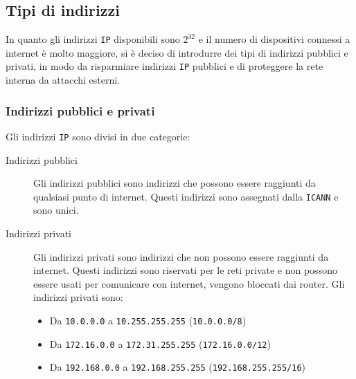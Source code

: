     \subsection{Tipi di indirizzi}
        In quanto gli indirizzi \texttt{IP} disponibili sono $2^{32}$ e il numero di dispositivi connessi a internet è molto maggiore, si è deciso di introdurre dei tipi di indirizzi pubblici e privati, in modo da risparmiare indirizzi \texttt{IP} pubblici e di proteggere la rete interna da attacchi esterni.
        \subsubsection{Indirizzi pubblici e privati}
            Gli indirizzi \texttt{IP} sono divisi in due categorie: \begin{description}
                \item[Indirizzi pubblici] Gli indirizzi pubblici sono indirizzi che possono essere raggiunti da qualsiasi punto di internet. Questi indirizzi sono assegnati dalla \texttt{ICANN} e sono unici.
                \item[Indirizzi privati] Gli indirizzi privati sono indirizzi che non possono essere raggiunti da internet. Questi indirizzi sono riservati per le reti private e non possono essere usati per comunicare con internet, vengono bloccati dai router. Gli indirizzi privati sono: \begin{itemize}
                    \item Da \texttt{10.0.0.0} a \texttt{10.255.255.255} (\texttt{10.0.0.0/8})
                    \item Da \texttt{172.16.0.0} a \texttt{172.31.255.255} (\texttt{172.16.0.0/12})
                    \item Da \texttt{192.168.0.0} a \texttt{192.168.255.255} (\texttt{192.168.255.255/16})
                \end{itemize}
            \end{description}
